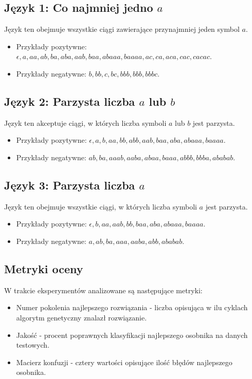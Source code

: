 \subsection{Język 1: Co najmniej jedno \( a \)}  
\label{sec:eksperyment4}
Język ten obejmuje wszystkie ciągi zawierające przynajmniej jeden symbol \( a \).  
\begin{itemize}  
    \item Przykłady pozytywne: \( \epsilon, a, aa, ab, ba, aba, aab, baa, abaaa, baaaa, ac, ca, aca, cac, cacac \).  
    \item Przykłady negatywne: \( b, bb, c, bc, bbb, bbb, bbbc \).  
\end{itemize}  

\subsection{Język 2: Parzysta liczba \( a \) lub \( b \)}  
\label{sec:eksperyment5}
Język ten akceptuje ciągi, w których liczba symboli \( a \) lub \( b \) jest parzysta.  
\begin{itemize}  
    \item Przykłady pozytywne: \( \epsilon, a, b, aa, bb, abb, aab, baa, aba, abaaa, baaaa \).  
    \item Przykłady negatywne: \( ab, ba, aaab, aaba, abaa, baaa, abbb, bbba, ababab \).  
\end{itemize}  

\subsection{Język 3: Parzysta liczba \( a \)}  
\label{sec:eksperyment6}
Język ten obejmuje wszystkie ciągi, w których liczba symboli \( a \) jest parzysta.  
\begin{itemize}  
    \item Przykłady pozytywne: \( \epsilon, b, aa, aab, bb, baa, aba, abaaa, baaaa \).  
    \item Przykłady negatywne: \( a, ab, ba, aaa, aaba, abb, ababab \).  
\end{itemize}

\subsection{Metryki oceny}  
W trakcie eksperymentów analizowane są następujące metryki:  
\begin{itemize}
    \item Numer pokolenia najlepszego rozwiązania - liczba opisująca w ilu cyklach algorytm genetyczny znalazł rozwiązanie.
    \item Jakość - procent poprawnych klasyfikacji najlepszego osobnika na danych testowych.
    \item Macierz konfuzji - cztery wartości opisujące ilość błędów najlepszego osobnika.
\end{itemize}  


